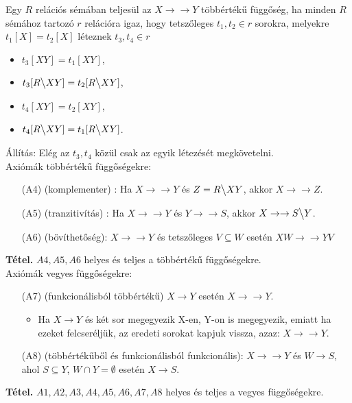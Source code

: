 \documentclass[tikz,12pt,margin=0px]{article}
\begin{document}
{    \noindent Egy $R$ relációs sémában teljesül az $X \to\to Y$ többértékű függőség, ha minden $R$ sémához tartozó $r$ relációra igaz, hogy tetszőleges $t_1, t_2 \in r$ sorokra, melyekre $t_1[X]=t_2[X]$ léteznek $t_3, t_4 \in r$
    \begin{itemize}
        \item $t_3[XY]=t_1[XY]$,
        \item $t_3[R \big\backslash XY]=t_2[R \big\backslash XY]$,
        \item $t_4[XY]=t_2[XY]$,
        \item $t_4[R \big\backslash XY]=t_1[R \big\backslash XY]$.
    \end{itemize}

    \noindent Állítás: Elég az $t_3, t_4$ közül csak az egyik létezését megkövetelni.\\

	\noindent Axiómák többértékű függőségekre:
	\begin{itemize}
        \item[(A4)] (komplementer) : Ha $X \to\to Y$ és $Z = R \big\backslash XY $, akkor $X \to\to Z$.
        \item[(A5)] (tranzitivítás) : Ha $X \to\to Y$ és $Y \to\to S$, akkor $X \to\to S \big\backslash Y$.
		\item[(A6)] (bövíthetőség): $X \to\to Y$ és tetszőleges $V \subseteq W$ esetén $XW \to\to YV$
	\end{itemize}

    \noindent \textbf{Tétel.} $A4, A5, A6$ helyes és teljes a többértékű függőségekre.\\
\newpage
    \noindent Axiómák vegyes függőségekre:
    \begin{itemize}
		\item [(A7)] (funkcionálisból többértékű) $X \to Y$ esetén $X \to\to Y$.
        \begin{itemize}
            \item Ha $X \to Y$ és két sor megegyezik X-en, Y-on is megegyezik, emiatt ha ezeket felcseréljük, az eredeti sorokat kapjuk vissza, azaz: $X \to\to Y$.
        \end{itemize}
		\item[(A8)] (többértékűből és funkcionálisból funkcionális): $X \to\to Y$ és $W \to S$, ahol $S \subseteq Y$, $W \cap Y = \emptyset$  esetén $X \to S$.
    \end{itemize}

    \noindent \textbf{Tétel.} $A1, A2, A3, A4, A5, A6, A7, A8$ helyes és teljes a vegyes függőségekre.\\

}
\end{document}
